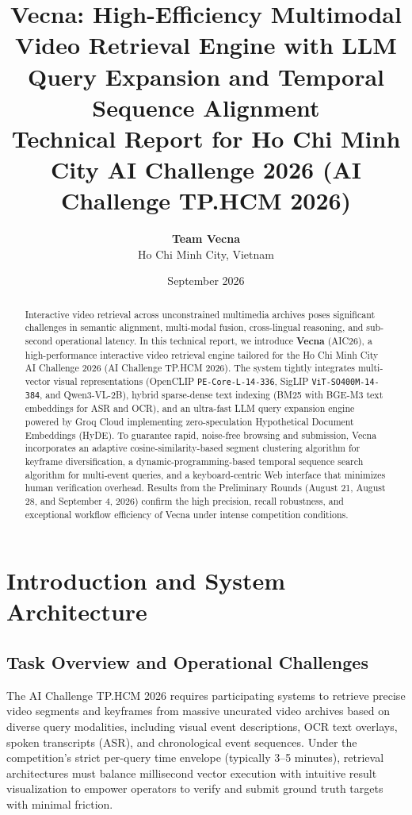 \documentclass[10pt,a4paper,twocolumn]{article}
\title{\vspace{-0.5cm}\textbf{\Large Vecna: High-Efficiency Multimodal Video Retrieval Engine with LLM Query Expansion and Temporal Sequence Alignment}\\[0.2cm]
\large Technical Report for Ho Chi Minh City AI Challenge 2026 (AI Challenge TP.HCM 2026)}
\author{
\textbf{Team Vecna} \\
Ho Chi Minh City, Vietnam
}
\date{September 2026}
\begin{document}
\maketitle

\begin{abstract}
Interactive video retrieval across unconstrained multimedia archives poses significant challenges in semantic alignment, multi-modal fusion, cross-lingual reasoning, and sub-second operational latency. In this technical report, we introduce \textbf{Vecna} (AIC26), a high-performance interactive video retrieval engine tailored for the Ho Chi Minh City AI Challenge 2026 (AI Challenge TP.HCM 2026). The system tightly integrates multi-vector visual representations (OpenCLIP \texttt{PE-Core-L-14-336}, SigLIP \texttt{ViT-SO400M-14-384}, and Qwen3-VL-2B), hybrid sparse-dense text indexing (BM25 with BGE-M3 text embeddings for ASR and OCR), and an ultra-fast LLM query expansion engine powered by Groq Cloud implementing zero-speculation Hypothetical Document Embeddings (HyDE). To guarantee rapid, noise-free browsing and submission, Vecna incorporates an adaptive cosine-similarity-based segment clustering algorithm for keyframe diversification, a dynamic-programming-based temporal sequence search algorithm for multi-event queries, and a keyboard-centric Web interface that minimizes human verification overhead. Results from the Preliminary Rounds (August 21, August 28, and September 4, 2026) confirm the high precision, recall robustness, and exceptional workflow efficiency of Vecna under intense competition conditions.
\end{abstract}

\section{Introduction and System Architecture}

\subsection{Task Overview and Operational Challenges}
The AI Challenge TP.HCM 2026 requires participating systems to retrieve precise video segments and keyframes from massive uncurated video archives based on diverse query modalities, including visual event descriptions, OCR text overlays, spoken transcripts (ASR), and chronological event sequences. Under the competition's strict per-query time envelope (typically 3--5 minutes), retrieval architectures must balance millisecond vector execution with intuitive result visualization to empower operators to verify and submit ground truth targets with minimal friction.
\end{document}
